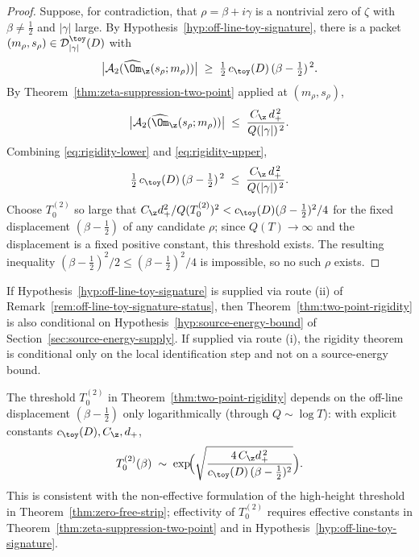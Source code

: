 \begin{proof}
Suppose, for contradiction, that \(\rho=\beta+i\gamma\) is a nontrivial
zero of \(\zeta\) with \(\beta\ne\tfrac12\) and \(|\gamma|\) large.
By Hypothesis~\ref{hyp:off-line-toy-signature}, there is a packet
\((m_\rho,s_\rho)\in\mathcal D_{|\gamma|}^\toy(D)\) with
\begin{equation}
\label{eq:rigidity-lower}
        \bigl|\mathcal A_2(\widehat\Om_\z(s_\rho;m_\rho))\bigr|
        \;\ge\; \tfrac12\,c_\toy(D)\,(\beta-\tfrac12)^{\,2}.
\end{equation}
By Theorem~\ref{thm:zeta-suppression-two-point} applied at
\((m_\rho,s_\rho)\),
\begin{equation}
\label{eq:rigidity-upper}
        \bigl|\mathcal A_2(\widehat\Om_\z(s_\rho;m_\rho))\bigr|
        \;\le\; \frac{C_\z\,d_+^{\,2}}{Q(|\gamma|)^{\,2}}.
\end{equation}
Combining \eqref{eq:rigidity-lower} and \eqref{eq:rigidity-upper},
\[
        \tfrac12\,c_\toy(D)\,(\beta-\tfrac12)^{\,2}
        \;\le\; \frac{C_\z\,d_+^{\,2}}{Q(|\gamma|)^{\,2}}.
\]
Choose \(T_0^{(2)}\) so large that
\(C_\z d_+^2/Q(T_0^{(2)})^2 < c_\toy(D) (\beta-\tfrac12)^2/4\) for the
fixed displacement \((\beta-\tfrac12)\) of any candidate \(\rho\); since
\(Q(T)\to\infty\) and the displacement is a fixed positive constant, this
threshold exists.  The resulting inequality
\((\beta-\tfrac12)^2/2 \le (\beta-\tfrac12)^2/4\) is impossible, so no
such \(\rho\) exists.
\end{proof}

\begin{remark}
\label{rem:two-point-energy-supply}
If Hypothesis~\ref{hyp:off-line-toy-signature} is supplied via route
\textup{(ii)} of Remark~\ref{rem:off-line-toy-signature-status}, then
Theorem~\ref{thm:two-point-rigidity} is also conditional on
Hypothesis~\ref{hyp:source-energy-bound} of
Section~\ref{sec:source-energy-supply}.  If supplied via route
\textup{(i)}, the rigidity theorem is conditional only on the local
identification step and not on a source-energy bound.
\end{remark}

\begin{remark}
\label{rem:two-point-effective-threshold}
The threshold \(T_0^{(2)}\) in
Theorem~\ref{thm:two-point-rigidity} depends on the off-line
displacement \((\beta-\tfrac12)\) only logarithmically (through
\(Q\sim\log T\)): with explicit constants
\(c_\toy(D),C_\z,d_+\),
\[
        T_0^{(2)}(\beta)
        \;\sim\;
        \exp\!\Bigl(\sqrt{\frac{4\,C_\z d_+^{\,2}}{c_\toy(D)\,(\beta-\tfrac12)^2}}\Bigr).
\]
This is consistent with the
non-effective formulation of the high-height threshold in
Theorem~\ref{thm:zero-free-strip}; effectivity of \(T_0^{(2)}\) requires
effective constants in
Theorem~\ref{thm:zeta-suppression-two-point} and in
Hypothesis~\ref{hyp:off-line-toy-signature}.
\end{remark}

